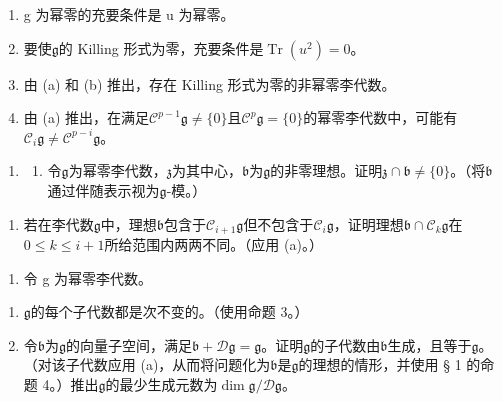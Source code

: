 \begin{enumerate}
\def\labelenumi{(\alph{enumi})}
\item
  g 为幂零的充要条件是 u 为幂零。
\item
  要使\(\mathfrak{g}\)的 Killing 形式为零，充要条件是\(\operatorname{Tr}(u^2) = 0\)。
\item
  由 (a) 和 (b) 推出，存在 Killing 形式为零的非幂零李代数。
\item
  由 (a) 推出，在满足\(\mathcal{C}^{p-1}\mathfrak{g} \neq \{0\}\)且\(\mathcal{C}^p\mathfrak{g} = \{0\}\)的幂零李代数中，可能有\(\mathcal{C}_i\mathfrak{g} \neq \mathcal{C}^{p-i}\mathfrak{g}\)。
\end{enumerate}

\begin{enumerate}
\def\labelenumi{\arabic{enumi}.}
\setcounter{enumi}{2}
\tightlist
\item
  \begin{enumerate}
  \def\labelenumii{(\alph{enumii})}
  \tightlist
  \item
    令\(\mathfrak{g}\)为幂零李代数，\(\mathfrak{z}\)为其中心，\(\mathfrak{b}\)为\(\mathfrak{g}\)的非零理想。证明\(\mathfrak{z} \cap \mathfrak{b} \neq \{0\}\)。（将\(\mathfrak{b}\)通过伴随表示视为\(\mathfrak{g}\)-模。）
  \end{enumerate}
\end{enumerate}

\begin{enumerate}
\def\labelenumi{(\alph{enumi})}
\setcounter{enumi}{1}
\tightlist
\item
  若在李代数\(\mathfrak{g}\)中，理想\(\mathfrak{b}\)包含于\(\mathcal{C}_{i+1}\mathfrak{g}\)但不包含于\(\mathcal{C}_i\mathfrak{g}\)，证明理想\(\mathfrak{b} \cap \mathcal{C}_k\mathfrak{g}\)在\(0 \leqslant k \leqslant i + 1\)所给范围内两两不同。（应用 (a)。）
\end{enumerate}

\begin{enumerate}
\def\labelenumi{\arabic{enumi}.}
\setcounter{enumi}{3}
\tightlist
\item
  令 g 为幂零李代数。
\end{enumerate}

\begin{enumerate}
\def\labelenumi{(\alph{enumi})}
\item
  \(\mathfrak{g}\)的每个子代数都是次不变的。（使用命题 3。）
\item
  令\(\mathfrak{b}\)为\(\mathfrak{g}\)的向量子空间，满足\(\mathfrak{b} + \mathcal{D}\mathfrak{g} = \mathfrak{g}\)。证明\(\mathfrak{g}\)的子代数由\(\mathfrak{b}\)生成，且等于\(\mathfrak{g}\)。（对该子代数应用 (a)，从而将问题化为\(\mathfrak{b}\)是\(\mathfrak{g}\)的理想的情形，并使用 § 1 的命题 4。）推出\(\mathfrak{g}\)的最少生成元数为\(\dim \mathfrak{g}/\mathcal{D}\mathfrak{g}\)。
\end{enumerate}

